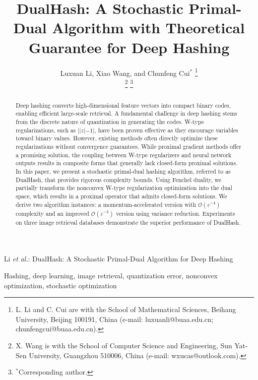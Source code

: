 \documentclass[journal]{IEEEtran}
\begin{document}
\title{DualHash: A Stochastic Primal-Dual Algorithm with Theoretical Guarantee for Deep Hashing}

\author{Luxuan Li,
      Xiao Wang, and  Chunfeng Cui$^{\ast}$
\thanks{L. Li and C. Cui are with the School of Mathematical Sciences, Beihang University, Beijing 100191, China (e-mail: luxuanli@buaa.edu.cn; chunfengcui@buaa.edu.cn).}

\thanks{X. Wang is with the School of Computer Science and Engineering, Sun Yat-Sen University, Guangzhou 510006, China (e-mail: wxucas@outlook.com).}%
\thanks{$^{\ast}$Corresponding author.}}

\markboth{}
{Li \textit{et al.}: DualHash: A Stochastic Primal-Dual Algorithm for Deep Hashing}


\maketitle
\begin{abstract}
Deep hashing converts high-dimensional feature vectors into compact binary codes, enabling efficient large-scale retrieval. A fundamental challenge in deep hashing stems from the discrete nature of quantization in generating the codes. W-type regularizations, such as $||z|-1|$, have been proven effective as they encourage variables toward binary values. However, existing methods often directly optimize these regularizations without convergence guarantees. While proximal gradient methods offer a promising solution, the coupling between W-type regularizers and neural network outputs results in composite forms that generally lack closed-form proximal solutions. In this paper, we present a stochastic primal-dual hashing algorithm, referred to as DualHash, that provides rigorous complexity bounds. Using Fenchel duality, we partially transform the nonconvex W-type regularization optimization into the dual space, which results in a proximal operator that admits closed-form solutions. We derive two algorithm instances: a momentum-accelerated version with $\mathcal{O}(\varepsilon^{-4})$ complexity and an improved $\mathcal{O}(\varepsilon^{-3})$ version using variance reduction. Experiments on three image retrieval databases demonstrate the superior performance of DualHash.
\end{abstract}

\begin{IEEEkeywords}
Hashing, deep learning, image retrieval, quantization error, nonconvex optimization, stochastic optimization
\end{IEEEkeywords}
\end{document}
